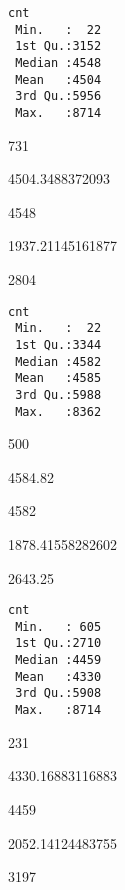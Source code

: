 \documentclass[11pt]{article}
\begin{document}
    
    \begin{Verbatim}[commandchars=\\\{\}]
      cnt      
 Min.   :  22  
 1st Qu.:3152  
 Median :4548  
 Mean   :4504  
 3rd Qu.:5956  
 Max.   :8714  
    \end{Verbatim}

    
    731

    
    4504.3488372093

    
    4548

    
    1937.21145161877

    
    2804

    
    
    \begin{Verbatim}[commandchars=\\\{\}]
      cnt      
 Min.   :  22  
 1st Qu.:3344  
 Median :4582  
 Mean   :4585  
 3rd Qu.:5988  
 Max.   :8362  
    \end{Verbatim}

    
    500

    
    4584.82

    
    4582

    
    1878.41558282602

    
    2643.25

    
    
    \begin{Verbatim}[commandchars=\\\{\}]
      cnt      
 Min.   : 605  
 1st Qu.:2710  
 Median :4459  
 Mean   :4330  
 3rd Qu.:5908  
 Max.   :8714  
    \end{Verbatim}

    
    231

    
    4330.16883116883

    
    4459

    
    2052.14124483755

    
    3197
\end{document}
